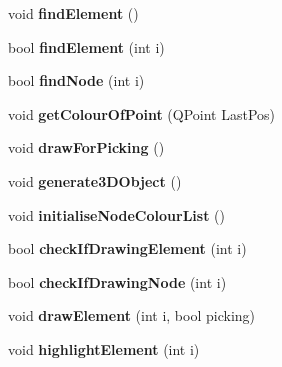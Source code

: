 \begin{DoxyCompactItemize}
\item 
\hypertarget{classGLWidget_a7fe217738ad7d4c54caa575068641234}{}void {\bfseries find\+Element} ()\label{classGLWidget_a7fe217738ad7d4c54caa575068641234}

\item 
\hypertarget{classGLWidget_aa1c349f897d0fee1163abba8fd39995c}{}bool {\bfseries find\+Element} (int i)\label{classGLWidget_aa1c349f897d0fee1163abba8fd39995c}

\item 
\hypertarget{classGLWidget_a7ff762be5c3562616b6cc4bc6d6b6683}{}bool {\bfseries find\+Node} (int i)\label{classGLWidget_a7ff762be5c3562616b6cc4bc6d6b6683}

\item 
\hypertarget{classGLWidget_afc09ab8fa7a8163ca1b69e7953e33dc4}{}void {\bfseries get\+Colour\+Of\+Point} (Q\+Point Last\+Pos)\label{classGLWidget_afc09ab8fa7a8163ca1b69e7953e33dc4}

\item 
\hypertarget{classGLWidget_a218fadfeda519fd8a120b702f04771c8}{}void {\bfseries draw\+For\+Picking} ()\label{classGLWidget_a218fadfeda519fd8a120b702f04771c8}

\item 
\hypertarget{classGLWidget_a1f66af8462807ed77b878cba3e60bbb9}{}void {\bfseries generate3\+D\+Object} ()\label{classGLWidget_a1f66af8462807ed77b878cba3e60bbb9}

\item 
\hypertarget{classGLWidget_a30be9e529d717552be70cbad097d99e8}{}void {\bfseries initialise\+Node\+Colour\+List} ()\label{classGLWidget_a30be9e529d717552be70cbad097d99e8}

\item 
\hypertarget{classGLWidget_a8597de4600272fb1720641fd1990f153}{}bool {\bfseries check\+If\+Drawing\+Element} (int i)\label{classGLWidget_a8597de4600272fb1720641fd1990f153}

\item 
\hypertarget{classGLWidget_a4e843eda050d818414f6c722f806cf88}{}bool {\bfseries check\+If\+Drawing\+Node} (int i)\label{classGLWidget_a4e843eda050d818414f6c722f806cf88}

\item 
\hypertarget{classGLWidget_aa85fc1e14fb11fc62ce93cc72ffb5a61}{}void {\bfseries draw\+Element} (int i, bool picking)\label{classGLWidget_aa85fc1e14fb11fc62ce93cc72ffb5a61}

\item 
\hypertarget{classGLWidget_ada0503af64f483c91e342ba5c3dcef49}{}void {\bfseries highlight\+Element} (int i)\label{classGLWidget_ada0503af64f483c91e342ba5c3dcef49}


\end{DoxyCompactItemize}
